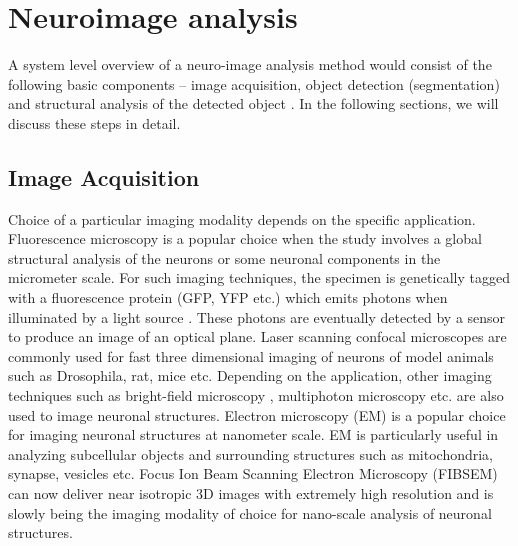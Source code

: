 \section{Neuroimage analysis}
A system level overview of a neuro-image analysis method would consist of the following basic components – image acquisition, object detection (segmentation) and structural analysis of the detected object \cite{meijering_survey}. In the following sections, we will discuss these steps in detail.

\subsection{Image Acquisition}
Choice of a particular imaging modality depends on the specific application. Fluorescence microscopy is a popular choice when the study involves a global structural analysis of the neurons or some neuronal components in the micrometer scale. For such imaging techniques, the specimen is genetically tagged with a fluorescence protein (GFP, YFP etc.) which emits photons when illuminated by a light source \cite{barry_branching}. These photons are eventually detected by a sensor to produce an image of an optical plane. Laser scanning confocal microscopes are commonly used for fast three dimensional imaging of neurons of model animals such as Drosophila, rat, mice etc. Depending on the application, other imaging techniques such as bright-field microscopy \cite{oberlaender2007transmitted}, multiphoton microscopy \cite{santamaria2007automatic} etc. are also used to image neuronal structures.   Electron microscopy (EM) is a popular choice for imaging neuronal structures at nanometer scale. EM is particularly useful in analyzing subcellular objects and surrounding structures such as mitochondria, synapse, vesicles etc. Focus Ion Beam Scanning Electron Microscopy (FIBSEM) \cite{kreshuk2011automated} can now deliver near isotropic 3D images with extremely high resolution and is slowly being the imaging modality of choice for nano-scale analysis of neuronal structures. 

